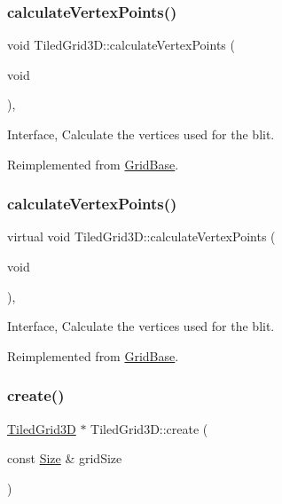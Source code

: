 \subsubsection{\texorpdfstring{calculate\+Vertex\+Points()}{calculateVertexPoints()}\hspace{0.1cm}{\footnotesize\ttfamily [1/2]}}
{\footnotesize\ttfamily void Tiled\+Grid3\+D\+::calculate\+Vertex\+Points (\begin{DoxyParamCaption}\item[{void}]{ }\end{DoxyParamCaption})\hspace{0.3cm}{\ttfamily [override]}, {\ttfamily [virtual]}}

Interface, Calculate the vertices used for the blit. 

Reimplemented from \hyperlink{classGridBase_a339fdde120c6f38f6bc2e78d3bb7636f}{Grid\+Base}.

\mbox{\label{classTiledGrid3D_a0ae62db952e86b1f609e0ab3665947ca}} 
\subsubsection{\texorpdfstring{calculate\+Vertex\+Points()}{calculateVertexPoints()}\hspace{0.1cm}{\footnotesize\ttfamily [2/2]}}
{\footnotesize\ttfamily virtual void Tiled\+Grid3\+D\+::calculate\+Vertex\+Points (\begin{DoxyParamCaption}\item[{void}]{ }\end{DoxyParamCaption})\hspace{0.3cm}{\ttfamily [override]}, {\ttfamily [virtual]}}

Interface, Calculate the vertices used for the blit. 

Reimplemented from \hyperlink{classGridBase_a339fdde120c6f38f6bc2e78d3bb7636f}{Grid\+Base}.

\mbox{\label{classTiledGrid3D_aa4c025a43abe6289034faead66a716c8}} 
\subsubsection{\texorpdfstring{create()}{create()}\hspace{0.1cm}{\footnotesize\ttfamily [1/8]}}
{\footnotesize\ttfamily \hyperlink{classTiledGrid3D}{Tiled\+Grid3D} $\ast$ Tiled\+Grid3\+D\+::create (\begin{DoxyParamCaption}\item[{const \hyperlink{classSize}{Size} \&}]{grid\+Size }\end{DoxyParamCaption})\hspace{0.3cm}{\ttfamily [static]}}

